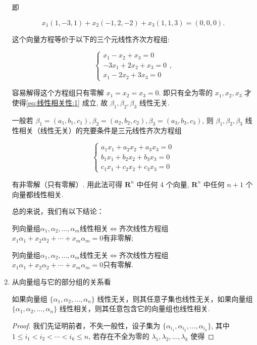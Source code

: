 \begin{enumerate}
\begin{solution}
              即

              \[
                  x_1(1, -3, 1) + x_2(-1, 2, -2) + x_3(1, 1, 3) = (0, 0, 0).
              \]

              这个向量方程等价于以下的三个元线性齐次方程组:

              \[
                  \begin{cases}
                      x_1 - x_2 + x_3 = 0    \\
                      -3x_1 + 2x_2 + x_3 = 0 \\
                      x_1 - 2x_2 + 3x_3 = 0
                  \end{cases},
              \]

              容易解得这个方程组只有零解 $x_1 = x_2 = x_3 = 0$. 即只有全为零的 $x_1, x_2, x_3$ 才使得\autoref{eq:线性相关性:1} 成立, 故 $\beta_1, \beta_2, \beta_3$ 线性无关.

              一般若 $\beta_1 = (a_1, b_1, c_1), \beta_2 = (a_2, b_2, c_2), \beta_3 = (a_3, b_3, c_3)$, 则 $\beta_1, \beta_2, \beta_3$ 线性相关（线性无关）的充要条件是三元线性齐次方程组

              \[
                  \begin{cases}
                      a_1 x_1 + a_2 x_2 + a_3 x_3 = 0 \\
                      b_1 x_1 + b_2 x_2 + b_3 x_3 = 0 \\
                      c_1 x_1 + c_2 x_2 + c_3 x_3 = 0
                  \end{cases}
              \]

              有非零解（只有零解）. 用此法可得 $\mathbf{R}^n$ 中任何 4 个向量, $\mathbf{R}^n$ 中任何 $n + 1$ 个向量都线性相关.

              总的来说，我们有以下结论：

              列向量组$\alpha_1,\alpha_2,\ldots,\alpha_m$线性相关$\iff$齐次线性方程组$x_1\alpha_1+x_2\alpha_2+\cdots+x_m\alpha_m=0$有非零解;

              列向量组$\alpha_1,\alpha_2,\ldots,\alpha_m$线性无关$\iff$齐次线性方程组$x_1\alpha_1+x_2\alpha_2+\cdots+x_m\alpha_m=0$只有零解.
          \end{solution}
    \item 从向量组与它的部分组的关系看
          \begin{example}{}{}
              如果向量组 $\{ \alpha_1,\alpha_2,\ldots,\alpha_n \}$ 线性无关，则其任意子集也线性无关，如果向量组 $\{ \alpha_1,\alpha_2,\ldots,\alpha_n \}$ 线性相关，则其任意包含它的向量组也线性相关.
          \end{example}
          \begin{proof}
              我们先证明前者，不失一般性，设子集为 $\{ \alpha_{i_1},\alpha_{i_2},\ldots,\alpha_{i_k} \}$, 其中 $1 \leqslant i_1 < i_2 < \cdots < i_k \leqslant n$, 若存在不全为零的 $\lambda_1,\lambda_2,\ldots,\lambda_k$ 使得


\end{proof}
\end{enumerate}
